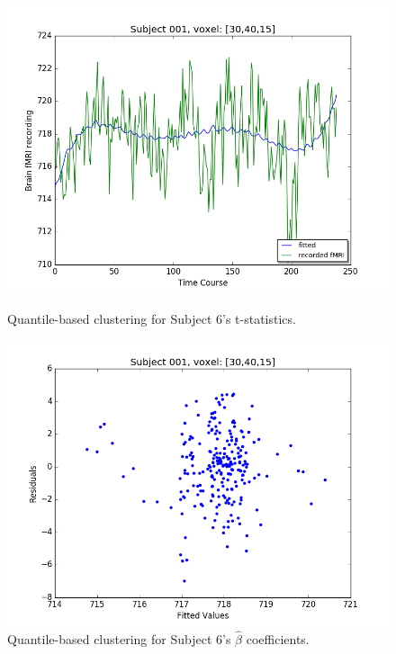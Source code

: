 \begin{figure}[ht]
\centering
\begin{minipage}[b]{0.45\linewidth}
	\centering
	\includegraphics[width=.8\linewidth]{../images/Fitted_v_Actual.png} 
	\caption{Quantile-based clustering for Subject 6's t-statistics.}
	\label{fig:clustert}
\end{minipage}	

\begin{minipage}[b]{0.45\linewidth}
	\centering
		\includegraphics[width=.8\linewidth]{../images/Fitted_v_Residuals.png} 
	\caption{Quantile-based clustering for Subject 6's $\hat{\beta}$ coefficients.}
	\label{fig:clusterbeta}
\end{minipage}


\end{figure}
